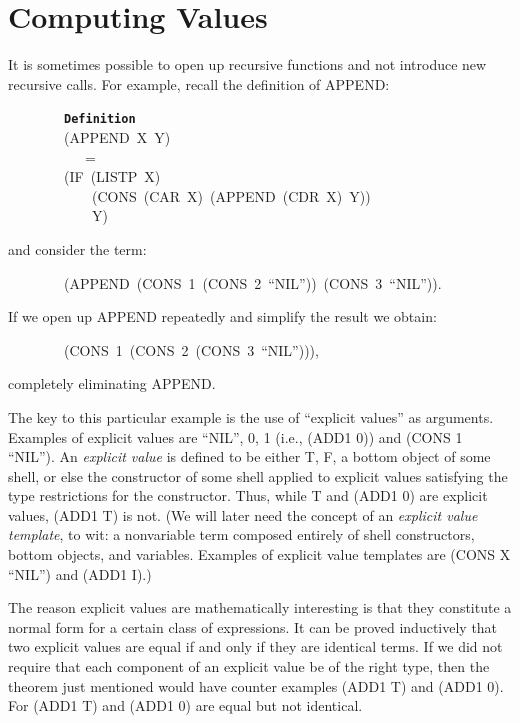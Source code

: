 \documentclass[11pt]{book}
\newenvironment{pubasis}{\begin{flushleft}\ttfamily\small}{\normalsize\rmfamily\end{flushleft}}
\newcommand{\axiomordefinition}[1]{\vspace{6pt}\texttt{\textbf{#1}}}
\newcommand{\pubinlineunderline}[1]{\emph{#1}}
\newcommand{\pubdefaulttextsize}{\large}
\begin{document}
\section{Computing Values}
\pubdefaulttextsize
It is sometimes possible to open up recursive functions and not introduce
new recursive calls.  For example, recall the definition of APPEND:
\begin{pubasis}
~~~~~~~~\axiomordefinition{Definition}\\
~~~~~~~~(APPEND~X~Y)\\
~~~~~~~~~~~=\\
~~~~~~~~(IF~(LISTP~X)\\
~~~~~~~~~~~~(CONS~(CAR~X)~(APPEND~(CDR~X)~Y))\\
~~~~~~~~~~~~Y)\\
\end{pubasis}
and consider the term:
\begin{pubasis}
~~~~~~~~(APPEND~(CONS~1~(CONS~2~``NIL''))~(CONS~3~``NIL'')).\\
\end{pubasis}
If we  open up APPEND repeatedly and simplify the result
we obtain:
\begin{pubasis}
~~~~~~~~(CONS~1~(CONS~2~(CONS~3~``NIL''))),\\
\end{pubasis}
completely eliminating APPEND.

The key to this particular example is the use of ``explicit values'' as
arguments.  Examples of explicit values are ``NIL'', 0, 1 (i.e., (ADD1 0)) and
(CONS 1 ``NIL'').  An \pubinlineunderline{explicit value} is defined to be either T, F, a
bottom object of some shell, or else the constructor of some shell
applied to explicit values satisfying the type restrictions
for the constructor.  Thus, while T and (ADD1 0) are 
explicit values, (ADD1 T) is not.
(We will later need the concept of an \pubinlineunderline{explicit value template},
to wit: a nonvariable term composed entirely of
shell constructors, bottom objects,
and variables.  Examples of explicit value templates
are (CONS X ``NIL'') and (ADD1 I).)

The reason explicit values are mathematically interesting is that they
constitute a normal form for a certain class of expressions.  It can
be proved inductively that two explicit values are equal if and only if
they are identical terms.  If we did not require that each component
of an explicit value be of the right type, then
the theorem just mentioned would have counter examples
(ADD1 T) and (ADD1 0).  For (ADD1 T) and
(ADD1 0) are equal but not identical.
\end{document}
